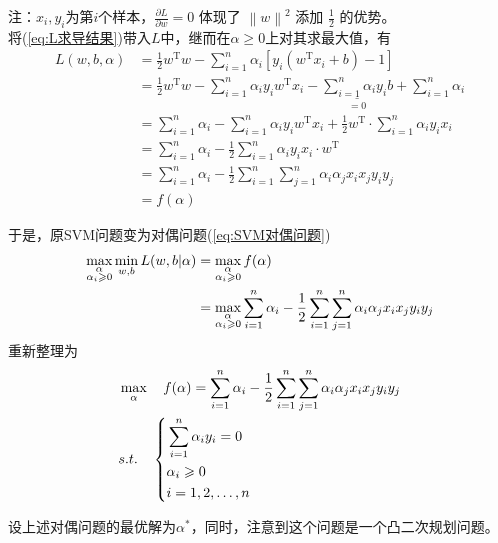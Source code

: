 		注：$x_i,y_i$为第$i$个样本，$\frac{\partial L}{\partial w} = 0$ 体现了 $ \left \| w \right \|^2$ 添加 $\frac{1}{2}$ 的优势。\\
		将(\ref{eq:L求导结果})带入$L$中，继而在$\alpha  \geqslant 0$上对其求最大值，有
		\begin{align*}
			L(w, b, \alpha)
			&= \frac{1}{2}w^\mathrm{T}w - \sum_{i=1}^{n} \alpha_i \left[ y_i(w^\mathrm{T}x_i + b) - 1 \right] \\
&= \frac{1}{2}w^\mathrm{T}w - \sum_{i=1}^{n} \alpha_i y_i w^\mathrm{T} x_i - \underset{{= 0}}{{\underline{\sum_{i=1}^{n} \alpha_i y_i b}}} + \sum_{i=1}^{n} \alpha_i \\
			&= \sum_{i=1}^{n} \alpha_i - \sum_{i=1}^{n} \alpha_i y_i w^\mathrm{T} x_i + \frac{1}{2}w^\mathrm{T} \cdot \sum_{i=1}^{n} \alpha_i y_i x_i \\
			&= \sum_{i=1}^{n} \alpha_i - \frac{1}{2} \sum_{i=1}^{n} \alpha_i y_i x_i \cdot w^\mathrm{T} \\
			&= \sum_{i=1}^{n} \alpha_i - \frac{1}{2} \sum_{i=1}^{n}\sum_{j=1}^{n} \alpha_i \alpha_j x_i x_j y_i y_j \\
			&= f(\alpha)
		\end{align*}
		\par
		于是，原SVM问题变为对偶问题(\ref{eq:SVM对偶问题})
		\begin{align}\label{eq:SVM对偶问题}
		\max_{\substack{\alpha\\ \alpha_i \geqslant 0}}\min_{w,b}L(w,b|\alpha)&=\max_{\substack{\alpha\\ \alpha_i \geqslant 0}}f(\alpha)\\
		&=\max_{\substack{\alpha\\ \alpha_i \geqslant 0}}\sum_{i=1}^n\alpha_i-\frac{1}{2}\sum_{i=1}^n\sum_{j=1}^n\alpha_i\alpha_j x_ix_jy_iy_j\notag
		\end{align}
		重新整理为
		\begin{align}
		& \max_\alpha \quad f(\alpha) =\sum_{i=1}^n\alpha_i-\frac{1}{2}\sum_{i=1}^n\sum_{j=1}^n\alpha_i\alpha_j x_ix_jy_iy_j\\
		& s.t.\quad
		\left\{
		\begin{aligned}
		& \sum_{i=1}^n \alpha_iy_i = 0 \notag \\
		& \alpha_i  \geqslant  0 \notag\\
		& i=1,2,\dots,n \notag\\
		\end{aligned}
		\right.
		\end{align}
		\par
		设上述对偶问题的最优解为$\alpha^*$，同时，注意到这个问题是一个凸二次规划问题。

